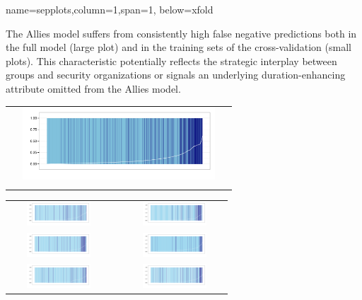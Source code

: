 \documentclass[landscape,paperheight=24in,fontscale=.45,paperwidth=36in,landscape,final]{baposter}
\begin{document}
\begin{poster}
{name=sepplots,column=1,span=1, below=xfold}
{
The Allies model suffers from consistently high false negative predictions both in the full model (large plot) and in the training sets of the
cross-validation (small plots). This characteristic potentially reflects the
strategic interplay between groups and security organizations or
signals an underlying duration-enhancing attribute omitted from the Allies model.
\vspace{-05mm}
\begin{center}
\begin{tabular}{c}
\includegraphics[height=27mm,width=81mm]{separationplotfullmodelSepPlot.pdf}\\
\vspace{-08mm}
\end{tabular}
\begin{tabular}{lcr}
\includegraphics[height=9mm,width=36mm]{separationplotsepDat1.pdf}& & \includegraphics[height=9mm,width=36mm]{separationplotsepDat2.pdf}\\
\includegraphics[height=9mm,width=36mm]{separationplotsepDat3.pdf}& & \includegraphics[height=9mm,width=36mm]{separationplotsepDat4.pdf}\\
\includegraphics[height=9mm,width=36mm]{separationplotsepDat5.pdf}& & \includegraphics[height=9mm,width=36mm]{separationplotsepDat6.pdf}\\

\end{tabular}
\end{center}}
\end{poster}
\end{document}
